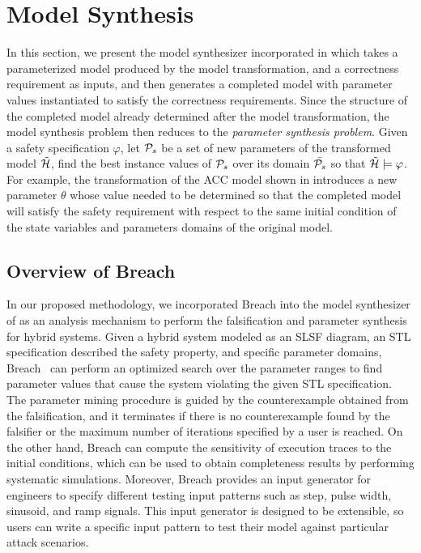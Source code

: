 \section{Model Synthesis}
%
In this section, we present the model synthesizer incorporated in \toolreaffirm which takes a parameterized model produced by the model transformation, and a correctness requirement as inputs, and then generates a completed model with parameter values instantiated to satisfy the correctness requirements. Since the structure of the completed model already determined after the model transformation, the model synthesis problem then reduces to the \emph{parameter synthesis problem}. Given a safety specification $\varphi$, let $\P_s$ be a set of new parameters of the transformed model $\tilde{\AutomatonH}$, find the best instance values of $\P_s$ over its domain $\bar{\P_s}$ so that $\tilde{\AutomatonH} \models\varphi$.  
%
For example, the transformation of the ACC model shown in  introduces a new parameter $\theta$ whose value needed to be determined so that the completed model will satisfy the safety requirement with respect to the same initial condition of the state variables and parameters domains of the original model.
%
%
\subsection{Overview of Breach}
%
%
In our proposed methodology, we incorporated Breach into the model synthesizer of \toolreaffirm as an analysis mechanism to perform the falsification and parameter synthesis for hybrid systems. Given a hybrid system modeled as an SLSF diagram, an STL specification described the safety property, and specific parameter domains, Breach~\cite{donze2010breach} can perform an optimized search over the parameter ranges to find parameter values that cause the system violating the given STL specification. 
%
%
The parameter mining procedure is guided by the counterexample obtained from the falsification, and it terminates if there is no counterexample found by the falsifier or the maximum number of iterations specified by a user is reached.
%
On the other hand, Breach can compute the sensitivity of execution traces to the initial conditions, which can be used to obtain completeness results by performing systematic simulations. Moreover, Breach provides an input generator for engineers to specify different testing input patterns such as step, pulse width, sinusoid, and ramp signals. This input generator is designed to be extensible, so users can write a specific input pattern to test their model against particular attack scenarios.


